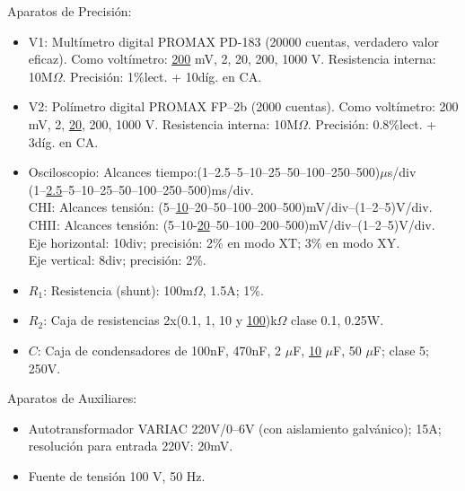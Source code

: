 \documentclass[a4paper,titlepage]{article}
\begin{document}
{\noindent Aparatos de Precisión:
\begin{itemize}
    \item V1: Multímetro digital PROMAX PD-183 (20000 cuentas, verdadero valor eficaz). Como voltímetro: \underline{200} mV, 2, 20, 200, 1000 V. Resistencia interna: 10M$\Omega$. Precisión: 1\%lect. + 10díg. en CA.
    \item V2: Polímetro digital PROMAX FP–2b (2000 cuentas). Como voltímetro: 200 mV, 2, \underline{20}, 200, 1000 V. Resistencia interna: 10M$\Omega$. Precisión: 0.8\%lect. + 3díg. en CA.
    \item Osciloscopio: 
    Alcances tiempo:(1–2.5–5–10–25–50–100–250–500)$\mu$s/div\\(1–\underline{2.5}–5–10–25–50–100–250–500)ms/div.\\
    CHI: Alcances tensión: (5–\underline{10}–20–50–100–200–500)mV/div–(1–2–5)V/div.\\
    CHII: Alcances tensión: (5–10-\underline{20}–50–100–200–500)mV/div–(1–2–5)V/div.\\
    Eje horizontal: 10div; precisión: 2\% en modo XT; 3\% en modo XY.\\
    Eje vertical: 8div; precisión: 2\%. 
    \item $R_1$: Resistencia (shunt): 100m$\Omega$, 1.5A; 1\%.
    \item $R_2$: Caja de resistencias 2x(0.1, 1, 10 y \underline{100})k$\Omega$ clase 0.1, 0.25W.
    \item $C$: Caja de condensadores de 100nF, 470nF, 2 $\mu$F, \underline{10} $\mu$F, 50 $\mu$F; clase 5; 250V. 
\end{itemize}

\noindent Aparatos de Auxiliares:
\begin{itemize}
    \item Autotransformador VARIAC 220V/0–6V (con aislamiento galvánico); 15A; resolución para entrada 220V: 20mV.
    \item Fuente de tensión 100 V, 50 Hz. 
\end{itemize}

}
\end{document}

